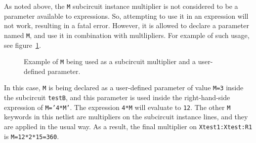 As noted above, the \texttt{M} subcircuit instance multiplier is not considered to be 
a parameter available to expressions.  So, attempting to use it in an expression will
not work, resulting in a fatal error.
However, it is allowed to declare a parameter named \texttt{M}, and use it in combination with multlipliers.
For example of such usage, see figure~\ref{Subcircuit_Multiplier_Example_4}.  
\begin{figure}[H]
\begin{centering}
\caption{Example of \texttt{M} being used as a subcircuit multiplier and a user-defined parameter.\label{Subcircuit_Multiplier_Example_4}}
\end{centering}
\end{figure}
In this case, \texttt{M} is being declared as a user-defined parameter of value \texttt{M=3} inside the subcircuit \texttt{testB}, and this parameter is used inside the right-hand-side expression of \texttt{M='4*M'}.   The expression \texttt{4*M} will evaluate to \texttt{12}.  The other \texttt{M} keywords in this netlist are multipliers on the subcircuit instance lines, and they are applied in the usual way.  As a result, the final multiplier on \texttt{Xtest1:Xtest:R1} is \texttt{M=12*2*15=360}.


